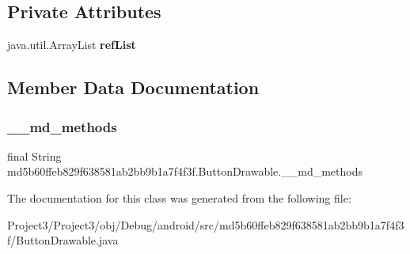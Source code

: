 \subsection*{Private Attributes}
\begin{DoxyCompactItemize}
\item 
\mbox{\label{classmd5b60ffeb829f638581ab2bb9b1a7f4f3f_1_1ButtonDrawable_ae370a961054bb1dae39a194afc0f2751}} 
java.\+util.\+Array\+List {\bfseries ref\+List}
\end{DoxyCompactItemize}


\subsection{Member Data Documentation}
\mbox{\label{classmd5b60ffeb829f638581ab2bb9b1a7f4f3f_1_1ButtonDrawable_aa04b94d1936232b4a6afd49d724c48c0}} 
\subsubsection{\texorpdfstring{\+\_\+\+\_\+md\+\_\+methods}{\_\_md\_methods}}
{\footnotesize\ttfamily final String md5b60ffeb829f638581ab2bb9b1a7f4f3f.\+Button\+Drawable.\+\_\+\+\_\+md\+\_\+methods\hspace{0.3cm}{\ttfamily [static]}}



The documentation for this class was generated from the following file\+:\begin{DoxyCompactItemize}
\item 
Project3/\+Project3/obj/\+Debug/android/src/md5b60ffeb829f638581ab2bb9b1a7f4f3f/Button\+Drawable.\+java\end{DoxyCompactItemize}
